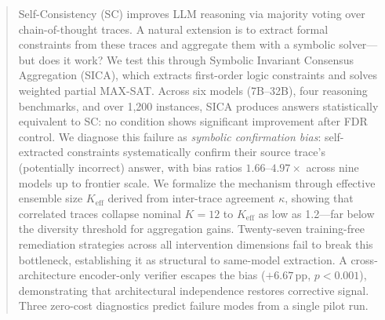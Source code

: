 \begin{abstract}
Self-Consistency (SC) improves LLM reasoning via majority voting over chain-of-thought traces.
A natural extension is to extract formal constraints from these traces and aggregate them with a symbolic solver---but does it work?
We test this through Symbolic Invariant Consensus Aggregation (SICA), which extracts first-order logic constraints and solves weighted partial MAX-SAT.
Across six models (7B--32B), four reasoning benchmarks, and over 1,200 instances, SICA produces answers statistically equivalent to SC: no condition shows significant improvement after FDR control.
We diagnose this failure as \emph{symbolic confirmation bias}: self-extracted constraints systematically confirm their source trace's (potentially incorrect) answer, with bias ratios $1.66$--$4.97\times$ across nine models up to frontier scale.
We formalize the mechanism through effective ensemble size $K_\text{eff}$ derived from inter-trace agreement $\kappa$, showing that correlated traces collapse nominal $K{=}12$ to $K_\text{eff}$ as low as 1.2---far below the diversity threshold for aggregation gains.
Twenty-seven training-free remediation strategies across all intervention dimensions fail to break this bottleneck, establishing it as structural to same-model extraction.
A cross-architecture encoder-only verifier escapes the bias ($+6.67$\,pp, $p < 0.001$), demonstrating that architectural independence restores corrective signal.
Three zero-cost diagnostics predict failure modes from a single pilot run.
\end{abstract}
